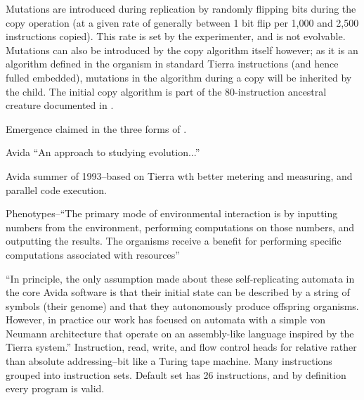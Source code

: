 Mutations are introduced during replication by randomly flipping bits during the copy operation (at a given rate of generally between 1 bit flip per 1,000 and 2,500 instructions copied). This rate is set by the experimenter, and is not evolvable. Mutations can also be introduced by the copy algorithm itself however; as it is an algorithm defined in the organism in standard Tierra instructions (and hence fulled embedded), mutations in the algorithm during a copy will be inherited by the child. The initial copy algorithm is part of the 80-instruction ancestral creature documented in \cite[app.C]{Ray1991}.

Emergence claimed in the three forms of \cite{Cariani1991}.


Avida \parencite{Ofria2004}
``An approach to studying evolution...''

Avida summer of 1993--based on Tierra wth better metering and measuring, and parallel code execution.

Phenotypes--``The primary mode of environmental interaction is by inputting numbers from the environment, performing computations on those numbers, and outputting the results. The organisms receive a benefit for performing specific computations associated with resources''

``In principle, the only assumption made about these self-replicating automata in the core Avida software is that their initial state can be described by a string of symbols (their genome) and that they autonomously produce offspring organisms. However, in practice our work has focused on automata with a simple von Neumann architecture that operate on an assembly-like language inspired by the Tierra system.''
Instruction, read, write, and flow control heads for relative rather than absolute addressing--bit like a Turing tape machine. Many instructions grouped into instruction sets. Default set has 26 instructions, and by definition every program is valid.

